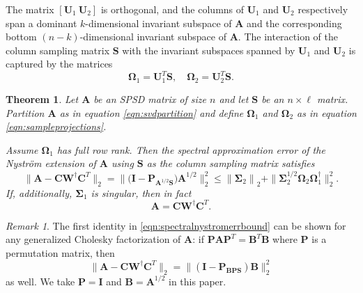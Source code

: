 \documentclass[11pt,letterpaper,twoside,reqno,nosumlimits]{amsart}
\def\pinv{\dagger}
\def\transp{T}
\newcommand{\mat}[1]{\ensuremath{\mathbf{#1}}}
\newcommand{\norm}[1]{\ensuremath{\big\|#1\big\|}}
\newcommand{\snorm}[1]{\ensuremath{\big\|#1\big\|_2}}
\newcommand{\snorms}[1]{\ensuremath{\big\|#1\big\|_2^2}}
\newtheorem{thm}{Theorem}
\theoremstyle{remark}
\newtheorem{remark}{Remark}
\begin{document}
The matrix $[\mat{U}_1\  \mat{U}_2]$ is orthogonal, and the columns of $\mat{U}_1$ and $\mat{U}_2$ respectively span a dominant $k$-dimensional invariant subspace of $\mat{A}$ and the corresponding bottom $(n-k)$-dimensional invariant subspace of $\mat{A}.$ The interaction of the column sampling matrix $\mat{S}$ with the invariant subspaces spanned by $\mat{U}_1$ and $\mat{U}_2$ is captured by the matrices
\begin{equation}
 \mat{\Omega}_1 = \mat{U}_1^\transp \mat{S}, \quad \mat{\Omega}_2 = \mat{U}_2^\transp \mat{S}.
\label{eqn:sampleprojections}
\end{equation}

\begin{thm}
Let $\mat{A}$ be an SPSD matrix of size $n$ and let $\mat{S}$ be an $n \times \ell$ matrix. Partition $\mat{A}$ as in equation \eqref{eqn:svdpartition} and define $\mat{\Omega}_1$ and $\mat{\Omega}_2$ as in equation \eqref{eqn:sampleprojections}.

Assume $\mat{\Omega}_1$ has full row rank. Then the spectral approximation error of the Nystr\"om extension of $\mat{A}$ using $\mat{S}$ as the column sampling matrix satisfies
\begin{equation}
\|\mat{A} - \mat{C}\mat{W}^\pinv \mat{C}^\transp\|_2 = \|\big(\mat{I} - \mat{P}_{\mat{A}^{1/2} \mat{S}}\big)\mat{A}^{1/2}\|_2^2 \leq \norm{\mat{\Sigma}_2}_2 + \|\mat{\Sigma}_2^{1/2} \mat{\Omega}_2 \mat{\Omega}_1^\pinv\|_2^2.
  \label{eqn:spectralnystromerrbound}
\end{equation}
If, additionally, $\mat{\Sigma}_1$ is singular, then in fact
\[
 \mat{A} = \mat{C}\mat{W}^\pinv \mat{C}^\transp.
\]
\label{thm:colselection}
\end{thm}



\begin{remark}
The first identity in \eqref{eqn:spectralnystromerrbound} can be shown for any generalized Cholesky factorization of $\mat{A}$: if $\mat{P} \mat{A} \mat{P}^\transp = \mat{B}^\transp \mat{B}$ where $\mat{P}$ is a permutation matrix, then 
\[
 \snorm{\mat{A} - \mat{C}\mat{W}^\pinv \mat{C}^\transp} = \snorms{(\mat{I} - \mat{P}_{\mat{B}\mat{P}\mat{S}})\mat{B}}
\]
as well. We take $\mat{P} = \mat{I}$ and $\mat{B} = \mat{A}^{1/2}$ in this paper.
\end{remark}
\end{document}
